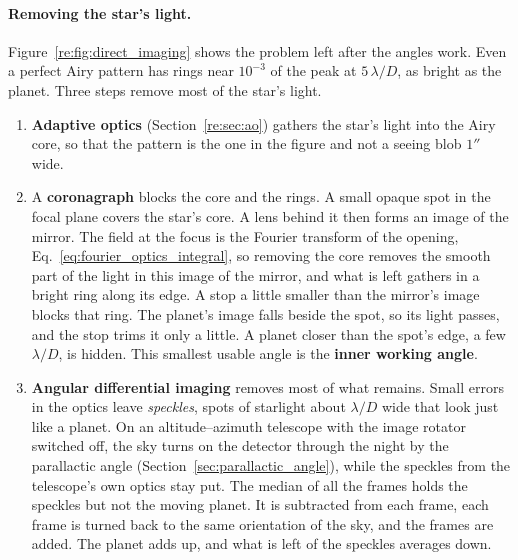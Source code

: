 \paragraph{Removing the star's light.} Figure~\ref{re:fig:direct_imaging} shows the problem left after the angles work. Even a perfect Airy pattern has rings near $10^{-3}$ of the peak at $5\,\lambda/D$, as bright as the planet. Three steps remove most of the star's light.
\begin{enumerate}
	\item \textbf{Adaptive optics} (Section~\ref{re:sec:ao}) gathers the star's light into the Airy core, so that the pattern is the one in the figure and not a seeing blob $1''$ wide.
	\item A \textbf{coronagraph} blocks the core and the rings. A small opaque spot in the focal plane covers the star's core. A lens behind it then forms an image of the mirror. The field at the focus is the Fourier transform of the opening, Eq.~\eqref{eq:fourier_optics_integral}, so removing the core removes the smooth part of the light in this image of the mirror, and what is left gathers in a bright ring along its edge. A stop a little smaller than the mirror's image blocks that ring. The planet's image falls beside the spot, so its light passes, and the stop trims it only a little. A planet closer than the spot's edge, a few $\lambda/D$, is hidden. This smallest usable angle is the \textbf{inner working angle}.
	\item \textbf{Angular differential imaging} removes most of what remains. Small errors in the optics leave \emph{speckles}, spots of starlight about $\lambda/D$ wide that look just like a planet. On an altitude--azimuth telescope with the image rotator switched off, the sky turns on the detector through the night by the parallactic angle (Section~\ref{sec:parallactic_angle}), while the speckles from the telescope's own optics stay put. The median of all the frames holds the speckles but not the moving planet. It is subtracted from each frame, each frame is turned back to the same orientation of the sky, and the frames are added. The planet adds up, and what is left of the speckles averages down.
\end{enumerate}

